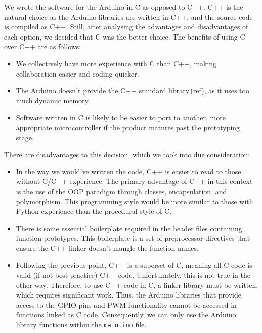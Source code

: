 \documentclass[twoside]{article}
\begin{document}
        We wrote the software for the Arduino in C as opposed to C++. C++ is the natural choice as the Arduino libraries are written in C++, and the source code is compiled as C++. Still, after analysing the advantages and disadvantages of each option, we decided that C was the better choice. The benefits of using C over C++ are as follows:
        \begin{itemize}
            \item We collectively have more experience with C than C++, making collaboration easier and coding quicker.
            \item The Arduino doesn't provide the C++ standard library (ref), as it uses too much dynamic memory.
            \item Software written in C is likely to be easier to port to another, more appropriate microcontroller if the product matures past the prototyping stage. 
        \end{itemize}
        There are disadvantages to this decision, which we took into due consideration:
        \begin{itemize}
            \item In the way we would've written the code, C++ is easier to read to those without C/C++ experience. The primary advantage of C++ in this context is the use of the OOP paradigm through classes, encapsulation, and polymorphism. This programming style would be more similar to those with Python experience than the procedural style of C. 
            \item There is some essential boilerplate required in the header files containing function prototypes. This boilerplate is a set of preprocessor directives that ensure the C++ linker doesn't mangle the function names. 
            \item Following the previous point, C++ is a superset of C, meaning all C code is valid (if not best practice) C++ code. Unfortunately, this is not true in the other way. Therefore, to use C++ code in C, a linker library must be written, which requires significant work. Thus, the Arduino libraries that provide access to the GPIO pins and PWM functionality cannot be accessed in functions linked as C code. Consequently, we can only use the Arduino library functions within the \texttt{main.ino} file. 
        \end{itemize}
\end{document}
